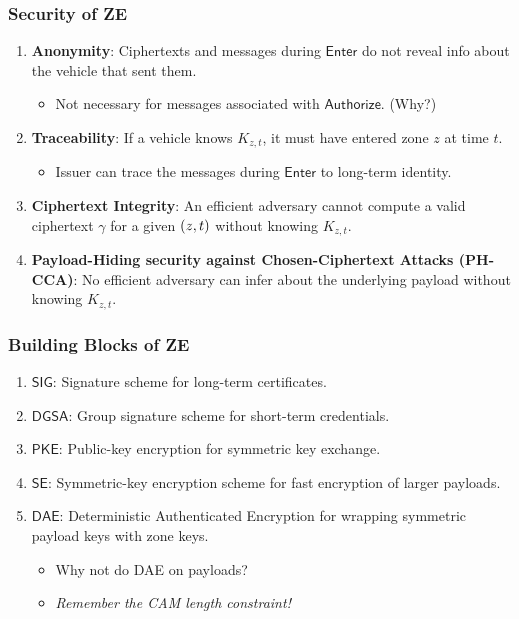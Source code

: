 \documentclass{beamer}
\begin{document}
    \begin{frame}
        \frametitle{Security of ZE}
        \begin{enumerate}
            \item \textbf{Anonymity}: Ciphertexts and messages during
            \(\mathsf{Enter}\) do not reveal info about the vehicle that sent
            them.
            \begin{itemize}
                \item Not necessary for messages associated with
                \(\mathsf{Authorize}\). (Why?)
            \end{itemize}
            \item<2-> \textbf{Traceability}: If a vehicle knows \(K_{z,t}\), it must
            have entered zone \(z\) at time \(t\).
            \begin{itemize}
                \item Issuer can trace the messages during \(\mathsf{Enter}\) to
                long-term identity.
            \end{itemize}
            \item<3-> \textbf{Ciphertext Integrity}: An efficient adversary cannot
            compute a valid ciphertext \(\gamma\) for a given \(\left(z,t\right)\)
            without knowing \(K_{z,t}\).
            \item<4-> \textbf{Payload-Hiding security against Chosen-Ciphertext
            Attacks (PH-CCA)}: No efficient adversary can infer about the
            underlying payload without knowing \(K_{z,t}\). 
        \end{enumerate}
    \end{frame}

    \begin{frame}
        \frametitle{Building Blocks of ZE}    
        \begin{enumerate}
            \item<1-> \(\mathsf{SIG}\): Signature scheme for long-term
            certificates.
            \item<2-> \(\mathsf{DGSA}\): Group signature scheme for short-term
            credentials.
            \item<3-> \(\mathsf{PKE}\): Public-key encryption for symmetric key
            exchange.
            \item<4-> \(\mathsf{SE}\): Symmetric-key encryption scheme for fast
            encryption of larger payloads.
            \item<5-> \(\mathsf{DAE}\): Deterministic Authenticated Encryption
            for wrapping symmetric payload keys with zone keys.
            \begin{itemize}
                \item Why not do DAE on payloads?
                \item<6-> \emph{Remember the CAM length constraint!}
            \end{itemize} 
        \end{enumerate}
    \end{frame}
\end{document}
